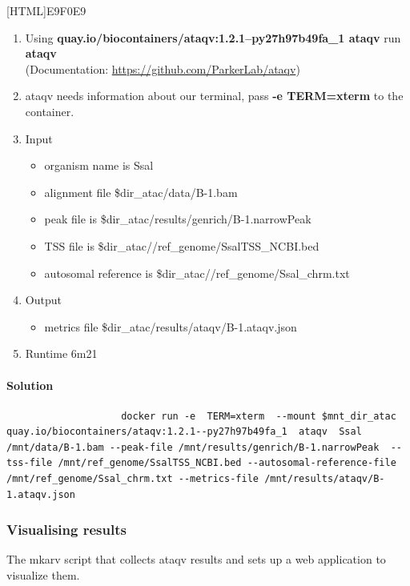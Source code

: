 \documentclass[12pt]{article}
\begin{document}
			[HTML]{E9F0E9}{\parbox{\linewidth}{%
					\begin{enumerate}
						\item  Using \textbf{quay.io/biocontainers/ataqv:1.2.1--py27h97b49fa\_1 ataqv} run \textbf{ataqv}\\
						(Documentation: \url{https://github.com/ParkerLab/ataqv})
						\item ataqv needs information about our terminal, pass \textbf{-e TERM=xterm} to the container.
						\item Input
						\begin{itemize}
							\item organism name is Ssal
							\item alignment file \$dir\_atac/data/B-1.bam
							\item peak file is \$dir\_atac/results/genrich/B-1.narrowPeak
							\item TSS file is \$dir\_atac//ref\_genome/SsalTSS\_NCBI.bed
							\item autosomal reference is \$dir\_atac//ref\_genome/Ssal\_chrm.txt
						\end{itemize}
						\item Output
							\begin{itemize}
								\item metrics file 	 \$dir\_atac/results/ataqv/B-1.ataqv.json
							\end{itemize}
						\item Runtime 6m21
					\end{enumerate}
			}}
			
			\paragraph{Solution}
			
			\begin{minipage}{\linewidth}
				\begin{lstlisting}
					docker run -e  TERM=xterm  --mount $mnt_dir_atac quay.io/biocontainers/ataqv:1.2.1--py27h97b49fa_1 	ataqv  Ssal  /mnt/data/B-1.bam --peak-file /mnt/results/genrich/B-1.narrowPeak 	--tss-file /mnt/ref_genome/SsalTSS_NCBI.bed --autosomal-reference-file /mnt/ref_genome/Ssal_chrm.txt --metrics-file /mnt/results/ataqv/B-1.ataqv.json
				\end{lstlisting}
			\end{minipage}
			
		\subsubsection{Visualising results}
			The mkarv script that collects ataqv results and sets up a web application to visualize them.
			
\end{document}
